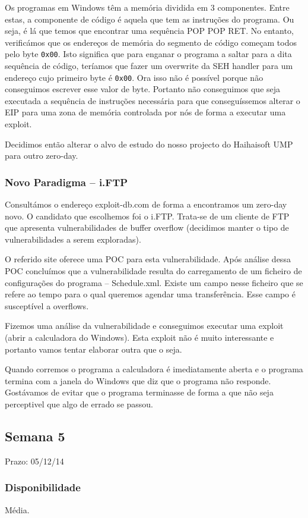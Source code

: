 \documentclass[a4paper]{article}
\begin{document}
Os programas em Windows têm a memória dividida em 3 componentes. Entre estas, a componente de código é aquela que tem as instruções do programa. Ou seja, é lá que temos que encontrar uma sequência POP POP RET. No entanto, verificámos que os endereços de memória do segmento de código começam todos pelo byte \texttt{0x00}. Isto significa que para enganar o programa a saltar para a dita sequência de código, teríamos que fazer um overwrite da SEH handler para um endereço cujo primeiro byte é \texttt{0x00}. Ora isso não é possível porque não conseguimos escrever esse valor de byte. Portanto não conseguimos que seja executada a sequência de instruções necessária para que conseguíssemos alterar o EIP para uma zona de memória controlada por nós de forma a executar uma exploit.

Decidimos então alterar o alvo de estudo do nosso projecto do Haihaisoft UMP para outro zero-day.


\subsubsection{Novo Paradigma -- i.FTP}
Consultámos o endereço exploit-db.com de forma a encontramos um zero-day novo. O candidato que escolhemos foi o i.FTP. Trata-se de um cliente de FTP que apresenta vulnerabilidades de buffer overflow (decidimos manter o tipo de vulnerabilidades a serem exploradas).

O referido site oferece uma POC para esta vulnerabilidade. Após análise dessa POC concluímos que a vulnerabilidade resulta do carregamento de um ficheiro de configurações do programa -- Schedule.xml. Existe um campo nesse ficheiro que se refere ao tempo para o qual queremos agendar uma transferência. Esse campo é susceptível a overflows.

Fizemos uma análise da vulnerabilidade e conseguimos executar uma exploit (abrir a calculadora do Windows). Esta exploit não é muito interessante e portanto vamos tentar elaborar outra que o seja.

Quando corremos o programa a calculadora é imediatamente aberta e o programa termina com a janela do Windows que diz que o programa não responde. Gostávamos de evitar 	que o programa terminasse de forma a que não seja perceptivel que algo de errado se passou.


\subsection{Semana 5}
Prazo: 05/12/14
\subsubsection{Disponibilidade}
Média.
\end{document}
